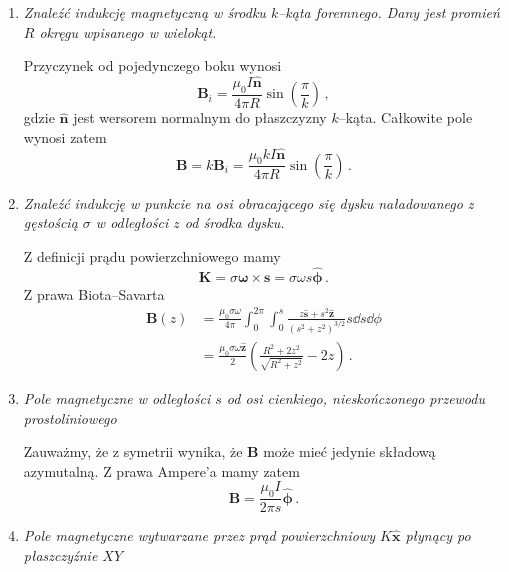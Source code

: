 \documentclass[../main.tex]{subfiles}
\begin{document}
\begin{enumerate}
    \item\textit{Znaleźć indukcję magnetyczną w środku \(k\)--kąta foremnego. Dany jest promień \(R\) okręgu wpisanego w wielokąt.}
    \medskip
    
    Przyczynek od pojedynczego boku wynosi
    \begin{equation*}
        \mathbf{B}_i=\frac{\mu_0I\mathbf{\hat{n}}}{4\pi R}\sin\left(\frac{\pi}{k}\right)\,,
    \end{equation*}
    gdzie \(\mathbf{\hat{n}}\) jest wersorem normalnym do płaszczyzny \(k\)--kąta. Całkowite pole wynosi zatem
    \begin{equation*}
        \mathbf{B}=k\mathbf{B}_i=\frac{\mu_0kI\mathbf{\hat{n}}}{4\pi R}\sin\left(\frac{\pi}{k}\right)\,.
    \end{equation*}
    
    \item\textit{Znaleźć indukcję w punkcie na osi obracającego się dysku naładowanego z gęstością \(\sigma\) w odległości \(z\) od środka dysku.}
    \medskip
    
    Z definicji prądu powierzchniowego mamy
    \begin{equation*}
        \mathbf{K}=\sigma\boldsymbol{\omega}\times\mathbf{s}=\sigma\omega s\boldsymbol{\hat{\phi}}\,.
    \end{equation*}
    Z prawa Biota--Savarta
    \begin{equation*}
    \begin{split}
        \mathbf{B}(z)&=\frac{\mu_0\sigma\omega}{4\pi}\int_0^{2\pi}\int_0^s\frac{z\mathbf{\hat{s}}+s^2\mathbf{\hat{z}}}{(s^2+z^2)^{3/2}}s \dd{s}\dd{\phi}\\
        &=\frac{\mu_0\sigma\omega\mathbf{\hat{z}}}{2}\left(\frac{R^2+2z^2}{\sqrt{R^2+z^2}}-2z\right)\,.
    \end{split}
    \end{equation*}
    \item \textit{Pole magnetyczne w odległości \(s\) od osi cienkiego, nieskończonego przewodu prostoliniowego}
    \medskip
    
    Zauważmy, że z symetrii wynika, że \(\mathbf{B}\) może mieć jedynie składową azymutalną. Z prawa Ampere'a mamy zatem
    \begin{equation*}
        \mathbf{B}=\frac{\mu_0I}{2\pi s}\boldsymbol{\hat{\phi}}\,.
    \end{equation*}
    
    \item\textit{Pole magnetyczne wytwarzane przez prąd powierzchniowy \(K\mathbf{\hat{x}}\) płynący po płaszczyźnie \(XY\)}
    \medskip
    

\end{enumerate}
\end{document}
